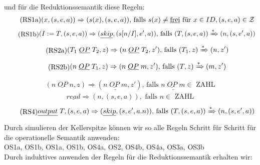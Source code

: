 \documentclass[ngerman,a4paper]{report}
\begin{document}
und für die Reduktionssemantik diese  Regeln:
\begin{equation}
\tag{RS1a}
\begin{split}
(x,(s,e,a)) \Rightarrow (s(x), (s,e,a))\text{, falls }s(x) \neq \text{\underline{frei}}\text{ für }x \in ID, (s,e,a) \in \mathcal{Z}
\end{split}
\label{eqn:RS1a}
\end{equation}
\begin{equation}
\tag{RS1b}
\begin{split}
(I:=T,(s,e,a)) \Rightarrow (\underline{skip}, (s[n/I],e',a))\text{, falls }(T, (s,e,a))\xRightarrow{*}(n,(s,e',a))
\end{split}
\label{eqn:RS1b}
\end{equation}
\begin{equation}
\tag{RS2a}
\begin{split}
(T_1\;\underline{OP}\;T_2, z) \Rightarrow (n\;\underline{OP}\;T_2, z')\text{, falls }(T_1, z) \xRightarrow{*}(n,z')
\end{split}
\label{eqn:RS2a}
\end{equation}	
\begin{equation}
\tag{RS2b}
\begin{split}
(n\;\underline{OP}\;T_1, z) \Rightarrow (n\;\underline{OP}\;m, z')\text{, falls }(T, z) \xRightarrow{*}(m,z')
\end{split}
\label{eqn:RS2b}
\end{equation}
\begin{equation}
\tag{RS2c}
\begin{split}
(n\;\underline{OP}\;n, z) \Rightarrow (\underline{n\;\underline{OP}\;m}, z')\text{, falls }\underline{n\;\underline{OP}\;m} \in\text{ ZAHL}
\end{split}
\label{eqn:RS2c}
\end{equation}
\begin{equation}
\tag{RS3}
\begin{split}
\underline{read} \Rightarrow (n, (s,e,a)), \text{ falls } n \in\text{ ZAHL}
\end{split}
\label{eqn:RS3}
\end{equation}
\begin{equation}
\tag{RS4}
\begin{split}
\underline{output}\;T, (s,e,a)\Rightarrow (\underline{skip}, (s,e',a.n))\text{, falls }(T, (s,e,a))\xRightarrow{*}(n,(s,e',a))
\end{split}
\label{eqn:RS4}
\end{equation}
Durch simulieren der Kellerspitze können wir so alle Regeln Schritt für Schritt für die operationelle Semantik anwenden:\\
OS1a, OS1b, OS1a, OS1b, OS4a, OS2, OS4b, OS4a, OS3a, OS3b\\
Durch induktives anwenden der Regeln für die Reduktionssemantik erhalten wir:\\
\end{document}
